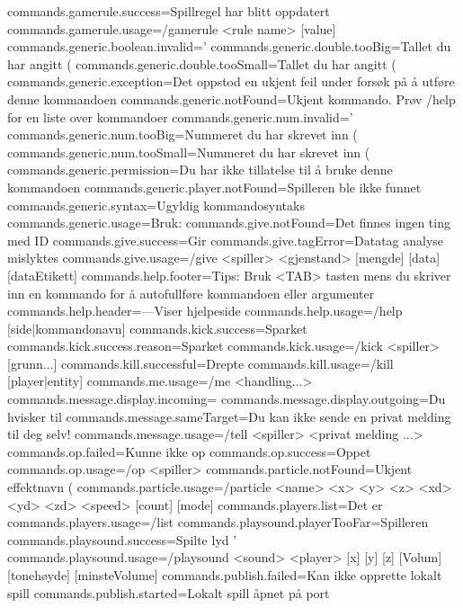commands.gamerule.success=Spillregel har blitt oppdatert
commands.gamerule.usage=/gamerule <rule name> [value]
commands.generic.boolean.invalid='%
commands.generic.double.tooBig=Tallet du har angitt (%
commands.generic.double.tooSmall=Tallet du har angitt (%
commands.generic.exception=Det oppstod en ukjent feil under forsøk på å utføre denne kommandoen
commands.generic.notFound=Ukjent kommando. Prøv /help for en liste over kommandoer
commands.generic.num.invalid='%
commands.generic.num.tooBig=Nummeret du har skrevet inn (%
commands.generic.num.tooSmall=Nummeret du har skrevet inn (%
commands.generic.permission=Du har ikke tillatelse til å bruke denne kommandoen
commands.generic.player.notFound=Spilleren ble ikke funnet
commands.generic.syntax=Ugyldig kommandosyntaks
commands.generic.usage=Bruk: %
commands.give.notFound=Det finnes ingen ting med ID %
commands.give.success=Gir %
commands.give.tagError=Datatag analyse mislyktes %
commands.give.usage=/give <spiller> <gjenstand> [mengde] [data] [dataEtikett]
commands.help.footer=Tips: Bruk <TAB> tasten mens du skriver inn en kommando for å autofullføre kommandoen eller argumenter
commands.help.header=---Viser hjelpeside %
commands.help.usage=/help [side|kommandonavn]
commands.kick.success=Sparket %
commands.kick.success.reason=Sparket %
commands.kick.usage=/kick <spiller> [grunn...]
commands.kill.successful=Drepte %
commands.kill.usage=/kill [player|entity]
commands.me.usage=/me <handling...>
commands.message.display.incoming=%
commands.message.display.outgoing=Du hvisker til %
commands.message.sameTarget=Du kan ikke sende en privat melding til deg selv!
commands.message.usage=/tell <spiller> <privat melding ...>
commands.op.failed=Kunne ikke op %
commands.op.success=Oppet %
commands.op.usage=/op <spiller>
commands.particle.notFound=Ukjent effektnavn (%
commands.particle.usage=/particle <name> <x> <y> <z> <xd> <yd> <zd> <speed> [count] [mode]
commands.players.list=Det er %
commands.players.usage=/list
commands.playsound.playerTooFar=Spilleren %
commands.playsound.success=Spilte lyd '%
commands.playsound.usage=/playsound <sound> <player> [x] [y] [z] [Volum] [tonehøyde] [minsteVolume]
commands.publish.failed=Kan ikke opprette lokalt spill
commands.publish.started=Lokalt spill åpnet på port %
